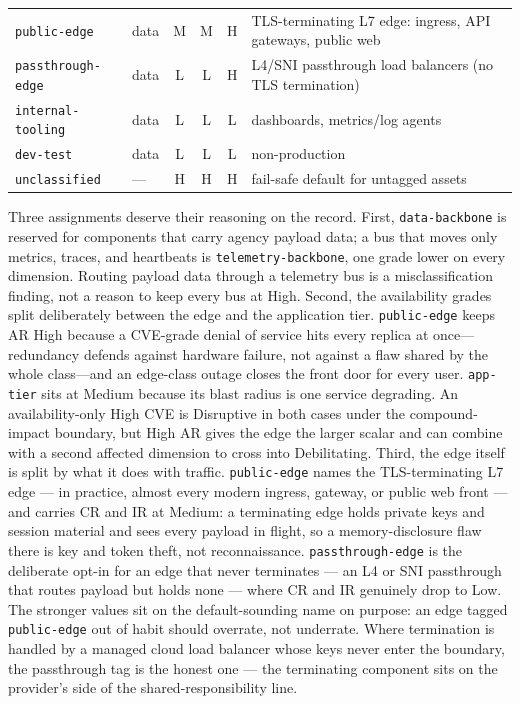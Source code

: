 \documentclass[11pt]{article}
\newcommand{\code}[1]{\texttt{#1}}
\begin{document}
\begin{table}[H]
\begin{tabular}{l l c c c >{\raggedright\arraybackslash}p{}}
\code{public-edge}        & data    & M & M & H & TLS-terminating L7 edge: ingress, API gateways, public web \\
\code{passthrough-edge}   & data    & L & L & H & L4/SNI passthrough load balancers (no TLS termination) \\
\code{internal-tooling}   & data    & L & L & L & dashboards, metrics/log agents \\
\code{dev-test}           & data    & L & L & L & non-production \\
\midrule
\code{unclassified}       & ---     & H & H & H & fail-safe default for untagged assets \\
\bottomrule
\end{tabular}
\end{table}

Three assignments deserve their reasoning on the record. First, \code{data-backbone}
is reserved for components that carry agency payload data; a bus that moves only
metrics, traces, and heartbeats is \code{telemetry-backbone}, one grade lower on
every dimension. Routing payload data through a telemetry bus is a
misclassification finding, not a reason to keep every bus at High. Second, the
availability grades split deliberately between the edge and the application tier.
\code{public-edge} keeps AR High because a CVE-grade denial of service hits every
replica at once---redundancy defends against hardware failure, not against a flaw
shared by the whole class---and an edge-class outage closes the front door for
every user. \code{app-tier} sits at Medium because its blast radius is one service
degrading. An availability-only High CVE is Disruptive in both cases under the
compound-impact boundary, but High AR gives the edge the larger scalar and can
combine with a second affected dimension to cross into Debilitating. Third, the
edge itself is split by what it
does with traffic. \code{public-edge} names the TLS-terminating L7 edge --- in
practice, almost every modern ingress, gateway, or public web front --- and
carries CR and IR at Medium: a terminating edge holds private keys and session
material and sees every payload in flight, so a memory-disclosure flaw there is
key and token theft, not reconnaissance. \code{passthrough-edge} is the
deliberate opt-in for an edge that never terminates --- an L4 or SNI passthrough
that routes payload but holds none --- where CR and IR genuinely drop to Low.
The stronger values sit on the default-sounding name on purpose: an edge tagged
\code{public-edge} out of habit should overrate, not underrate. Where
termination is handled by a managed cloud load balancer whose keys never enter
the boundary, the passthrough tag is the honest one --- the terminating
component sits on the provider's side of the shared-responsibility line.
\end{document}
